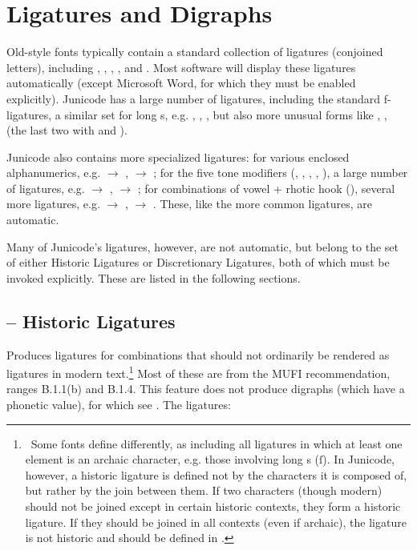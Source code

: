 \section{Ligatures and Digraphs}

Old-style fonts typically contain a standard collection of ligatures (conjoined letters), including
, , , , and .
Most software will display these ligatures automatically (except
Microsoft Word, for which they must be enabled explicitly). Junicode has a large number of ligatures,
including the standard f-ligatures, a similar set for long s, e.g. , , , but also
more unusual forms like ,
,
(the last two with  and ).

Junicode also contains more specialized ligatures: for various enclosed alphanumerics, e.g.
 $\rightarrow $ ,  $\rightarrow $ ;
for the five tone modifiers
(, , , , ), a large number of
ligatures, e.g.  $\rightarrow $ ,
 $\rightarrow $ ;
for combinations of vowel + rhotic hook (), several more ligatures, e.g.  $\rightarrow $ ,
 $\rightarrow $ .
These, like the more common ligatures, are automatic.

Many of Junicode’s
ligatures, however, are not automatic, but belong to the set of either Historic Ligatures
or Discretionary Ligatures, both of which must be invoked explicitly. These are listed in the following sections.

\subsection{ – Historic Ligatures}

Produces ligatures for combinations that should not ordinarily be rendered as
ligatures in modern text.\footnote{\ Some
fonts define  differently, as including all ligatures in which at least one
element is an archaic character, e.g.
those involving long s (\textrm{ſ\hspace{0.2em}}). In Junicode, however, a
historic ligature is defined not by the characters it is composed of, but
rather by the join between them. If two characters (though modern) should not be joined except
in certain historic contexts, they form a historic ligature. If they should be
joined in all contexts (even if archaic), the ligature is not historic
and should be defined in .} Most of these are from the MUFI recommendation,
ranges B.1.1(b) and B.1.4. This feature does
not produce digraphs (which have a phonetic value), for which see
. The ligatures:

